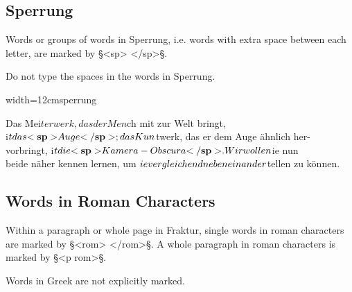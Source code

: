 
\tocspace
\subsection{Sperrung}
\label{section sperrung}

\begin{mainrule}
Words or groups of words in Sperrung, i.e. words with extra space between each letter, are marked by §<sp> </sp>§. 
\end{mainrule}

\begin{clarification}
Do not type the spaces in the words in Sperrung.
\end{clarification}

\vspace{3mm}
\begin{sampleImageSmall}{width=12cm}{sperrung}
\begin{typeLatin}
Das Mei$terwerk, das der Men$ch mit zur Welt bringt, \\
i$t das \bold{<sp>}Auge\bold{</sp>}; das Kun$twerk, das er dem Auge ähnlich her- \\
vorbringt, i$t die \bold{<sp>}Kamera-Obscura\bold{</sp>}. Wir wollen $ie nun \\
beide näher kennen lernen, um $ie vergleichend neben einander \\
$tellen zu können.
\end{typeLatin}
\end{sampleImageSmall}

\tocspace
\subsection{Words in Roman Characters}
\label{section words in roman characters}

\begin{mainrule}
Within a paragraph or whole page in Fraktur, single words in roman characters are marked by  §<rom> </rom>§. A whole paragraph in roman characters is marked by §<p rom>§.
\end{mainrule}

\begin{clarification}
Words in Greek are not explicitly marked.
\end{clarification}

